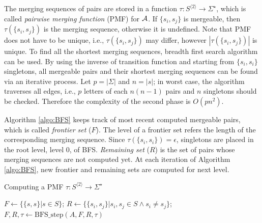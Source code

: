 \documentclass[12pt]{article}
\begin{document}
The merging sequences of pairs are stored in a function $\tau : S^{\langle 2 \rangle} \rightarrow \Sigma^\star$, which is called \textit{pairwise merging function} (PMF) for ${\cal A}$. If $\{ s_i, s_j \}$ is mergeable, then $\tau(\{ s_i, s_j \})$ is the merging sequence, otherwise it is undefined. Note that PMF does not have to be unique, i.e., $\tau(\{ s_i, s_j \})$ may differ, however  $|\tau(\{ s_i, s_j \})|$ is unique. To find all the shortest merging sequences, breadth first search algorithm can be used. By using the inverse of transition function and starting from $\{ s_i, s_i \}$ singletons, all mergeable pairs and their shortest merging sequences can be found via an iterative process. Let $p=|\Sigma|$ and $n=|s|$; in worst case, the algorithm traverses all edges, i.e., $p$ letters of each $n(n-1)$ pairs and $n$ singletons should be checked. Therefore the complexity of the second phase is $O(pn^2)$. 

Algorithm \ref{algo:BFS} keeps track of most recent computed mergeable pairs, which is called \textit{frontier set} ($F$). The level of a frontier set refers the length of the corresponding merging sequence. Since $\tau(\{ s_i, s_i \})=\epsilon$, singletons are placed in the root level, level 0, of BFS. \textit{Remaining set} ($R$) is the set of pairs whose merging sequences are not computed yet. At each iteration of Algorithm \ref{algo:BFS}, new frontier and remaining sets are computed for next level. 


\begin{algorithm}[ht]
	\caption{Computing a PMF $\tau : S^{\langle 2 \rangle} \rightarrow \Sigma^\star$}
	\label{algo:BFS}
	
	
	$F \longleftarrow \{ \{ s,s \} | s \in S \}$; 
    $R \longleftarrow \{ \{ s_i, s_j \} | s_i,s_j \in S \wedge s_i \neq s_j \}$; 
	{
		$F,R,\tau \longleftarrow \mbox{BFS\_step}(A,F,R,\tau)$\;
	}
\end{algorithm}
\end{document}
